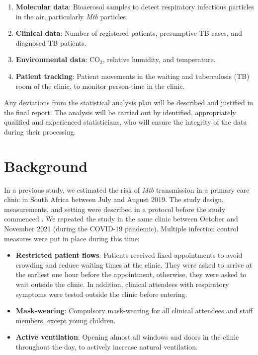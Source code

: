 \documentclass{article}
\begin{document}
\begin{enumerate}
    \item \textbf{Molecular data}: Bioaerosol samples to detect respiratory infectious particles in the air, particularly \emph{Mtb} particles.
    \item \textbf{Clinical data}: Number of registered patients, presumptive TB cases, and diagnosed TB patients. 
    \item \textbf{Environmental data}: CO$_2$, relative humidity, and temperature.
    \item \textbf{Patient tracking}: Patient movements in the waiting and tuberculosis (TB) room of the clinic, to monitor person-time in the clinic.
\end{enumerate}
 
Any deviations from the statistical analysis plan will be described and justified in the final report. The analysis will be carried out by identified, appropriately qualified and experienced statisticians, who will ensure the integrity of the data during their processing. 

\section{Background}

In a previous study, we estimated the risk of \emph{Mtb} transmission in a primary care clinic in South Africa between July and August 2019\cite{Zurcher2022JID}. The study design, measurements, and setting were described in a protocol before the study commenced \cite{Zurcher2020BMJ}. We repeated the study in the same clinic between October and November 2021 (during the COVID-19 pandemic). Multiple infection control measures were put in place during this time:

\begin{itemize}
    \item \textbf{Restricted patient flows}: Patients received fixed appointments to avoid crowding and reduce waiting times at the clinic.  They were asked to arrive at the earliest one hour before the appointment, otherwise, they were asked to wait outside the clinic. In addition, clinical attendees with respiratory symptoms were tested outside the clinic before entering.
    \item \textbf{Mask-wearing}: Compulsory mask-wearing for all clinical attendees and staff members, except young children.
    \item \textbf{Active ventilation}: Opening almost all windows and doors in the clinic throughout the day, to actively increase natural ventilation.
\end{itemize}
\end{document}
